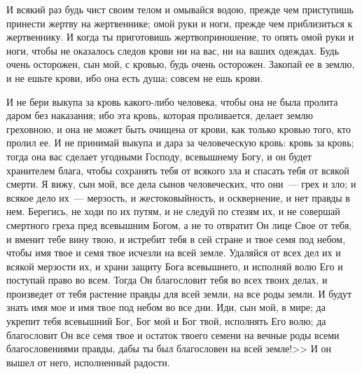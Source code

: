 И всякий раз будь чист своим телом и омывайся
водою, прежде чем приступишь принести жертву на
жертвеннике; омой руки и ноги, прежде чем
приблизиться к жертвеннику. И когда ты
приготовишь жертвоприношение, то опять омой руки
и ноги, чтобы не оказалось следов крови ни на вас,
ни на ваших одеждах. Будь очень осторожен, сын
мой, с кровью, будь очень осторожен. Закопай ее в
землю, и не ешьте крови, ибо она есть душа; совсем
не ешь крови.

И не бери выкупа за кровь какого-либо человека,
чтобы она не была пролита даром без наказания;
ибо эта кровь, которая проливается, делает землю
греховною, и она не может быть очищена от крови,
как только кровью того, кто пролил ее. И не
принимай выкупа и дара за человеческую кровь:
кровь за кровь; тогда она вас сделает угодными
Господу, всевышнему Богу, и он будет хранителем
блага, чтобы сохранять тебя от всякого зла и
спасать тебя от всякой смерти. Я вижу, сын мой, все
дела сынов человеческих, что они~--- грех и зло; и
всякое дело их~--- мерзость, и жестоковыйность, и
осквернение, и нет правды в нем. Берегись, не ходи
по их путям, и не следуй по стезям их, и не
совершай смертного греха пред всевышним Богом, а
не то отвратит Он лице Свое от тебя, и вменит тебе
вину твою, и истребит тебя в сей стране и твое
семя под небом, чтобы имя твое и семя твое исчезли
на всей земле. Удаляйся от всех дел их и всякой
мерзости их, и храни защиту Бога всевышнего, и
исполняй волю Его и поступай право во всем. Тогда
Он благословит тебя во всех твоих делах, и
произведет от тебя растение правды для всей
земли, на все роды земли. И будут знать имя мое и
имя твое под небом во все дни. Иди, сын мой, в мире;
да укрепит тебя всевышний Бог, Бог мой и Бог твой,
исполнять Его волю; да благословит Он все семя
твое и остаток твоего семени на вечные роды всеми
благословениями правды, дабы ты был благословен
на всей земле!>> И он вышел от него, исполненный
радости.

